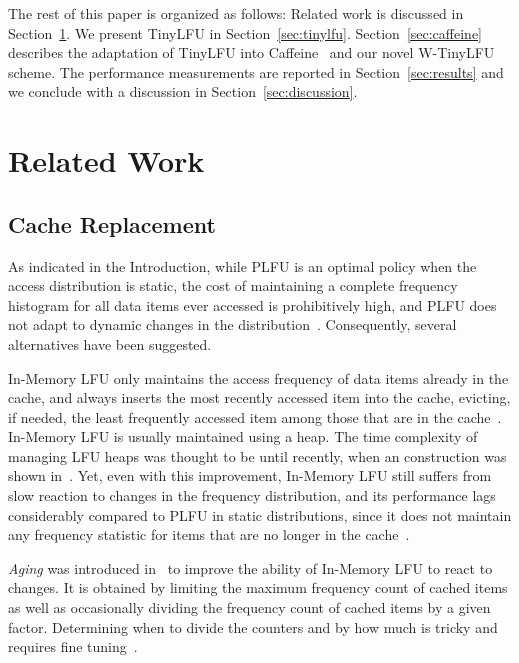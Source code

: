 \documentclass[10pt,a4paper]{article}
\begin{document}
The rest of this paper is organized as follows:
Related work is discussed in Section~\ref{sec:related}.
We present TinyLFU in Section~\ref{sec:tinylfu}.
Section~\ref{sec:caffeine} describes the adaptation of TinyLFU into Caffeine~\cite{CaffeineProject} and our novel W-TinyLFU scheme.
The performance measurements are reported in Section~\ref{sec:results} and we conclude with a discussion in Section~\ref{sec:discussion}.

\section{Related Work}
\label{sec:related}

\subsection{Cache Replacement}

As indicated in the Introduction, while PLFU is an optimal policy when the access distribution is static,
the cost of maintaining a complete frequency histogram for all data items ever accessed is prohibitively high,
and PLFU does not adapt to dynamic changes in the distribution~\cite{WLFU,LFUAGING,LFUDA}. Consequently, several alternatives have been suggested.

In-Memory LFU only maintains the access frequency of data items already in the cache, and always inserts the most recently accessed
item into the cache, evicting, if needed, the least frequently accessed item among those that are in the cache~\cite{SurveyOfCacheReplecmentStrategies}.
In-Memory LFU is usually maintained using a heap.
The time complexity of managing LFU heaps was thought to be  until recently, when an  construction was shown in~\cite{LFUIMPl}.
Yet, even with this improvement, In-Memory LFU still suffers from slow reaction to changes in the frequency distribution,
and its performance lags considerably compared to PLFU in static distributions, since it does not maintain
any frequency statistic for items that are no longer in the cache~\cite{SurveyOfCacheReplecmentStrategies}.


\emph{Aging} was introduced in~\cite{LFUAGING} to improve the ability of In-Memory LFU to react to changes.
It is obtained by limiting the maximum frequency count of cached items as well as occasionally dividing the frequency count of cached items by a given factor. Determining when to divide the counters and by how much is tricky and requires fine tuning~\cite{LFUDA}.
\end{document}
